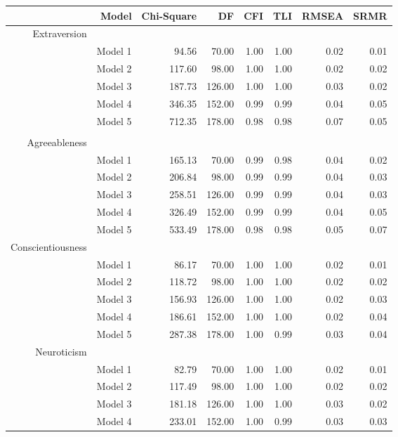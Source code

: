 \begin{table}[ht]
\begin{center}
\begin{tabular}{rrrrrrrr}
  \hline
 & Model & Chi-Square & DF & CFI & TLI & RMSEA & SRMR \\ 
  \hline
Extraversion & & & & & & \\
 & Model 1 & 94.56 & 70.00 & 1.00 & 1.00 & 0.02 & 0.01 \\ 
 & Model 2 & 117.60 & 98.00 & 1.00 & 1.00 & 0.02 & 0.02 \\ 
 & Model 3 & 187.73 & 126.00 & 1.00 & 1.00 & 0.03 & 0.02 \\ 
 & Model 4 & 346.35 & 152.00 & 0.99 & 0.99 & 0.04 & 0.05 \\ 
 &  Model 5 & 712.35 & 178.00 & 0.98 & 0.98 & 0.07 & 0.05 \\ 
 & & & & & & \\
Agreeableness & & & & & & & \\
 & Model 1 & 165.13 & 70.00 & 0.99 & 0.98 & 0.04 & 0.02 \\ 
 &  Model 2 & 206.84 & 98.00 & 0.99 & 0.99 & 0.04 & 0.03 \\ 
 &  Model 3 & 258.51 & 126.00 & 0.99 & 0.99 & 0.04 & 0.03 \\ 
 &  Model 4 & 326.49 & 152.00 & 0.99 & 0.99 & 0.04 & 0.05 \\ 
 &  Model 5 & 533.49 & 178.00 & 0.98 & 0.98 & 0.05 & 0.07 \\ 
Conscientiousness & & & & & & \\
 & Model 1 & 86.17 & 70.00 & 1.00 & 1.00 & 0.02 & 0.01 \\ 
 &  Model 2 & 118.72 & 98.00 & 1.00 & 1.00 & 0.02 & 0.02 \\ 
 &  Model 3 & 156.93 & 126.00 & 1.00 & 1.00 & 0.02 & 0.03 \\ 
 &  Model 4 & 186.61 & 152.00 & 1.00 & 1.00 & 0.02 & 0.04 \\ 
 &  Model 5 & 287.38 & 178.00 & 1.00 & 0.99 & 0.03 & 0.04 \\ 
Neuroticism & & & & & & \\
 & Model 1 & 82.79 & 70.00 & 1.00 & 1.00 & 0.02 & 0.01 \\ 
 &  Model 2 & 117.49 & 98.00 & 1.00 & 1.00 & 0.02 & 0.02 \\ 
 &  Model 3 & 181.18 & 126.00 & 1.00 & 1.00 & 0.03 & 0.02 \\ 
 &  Model 4 & 233.01 & 152.00 & 1.00 & 0.99 & 0.03 & 0.03 \\ 

\end{tabular}
\end{center}
\end{table}
